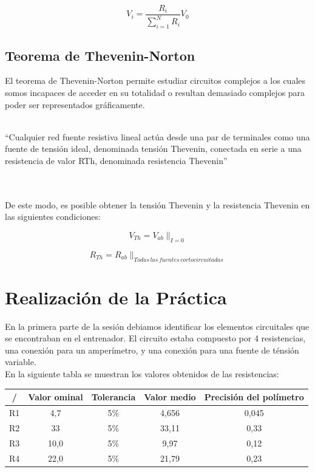 \documentclass[a4paper,11pt]{article}
\begin{document}
\begin{displaymath}
V_i=\frac{R_i}{\sum_{i=1}^N R_{i}}V_0
\end{displaymath}

\subsection{Teorema de Thevenin-Norton}
El teorema de Thevenin-Norton permite estudiar circuitos complejos a los cuales somos incapaces de acceder en su totalidad o resultan demasiado complejos para poder ser representados gráficamente.\\ \\
\begin{em}
“Cualquier red fuente resistiva lineal actúa desde una par de terminales como una fuente de tensión ideal, denominada tensión Thevenin, conectada en serie a una resistencia de valor RTh, denominada resistencia Thevenin”
\end{em}\\ \\
De este modo, es posible obtener la tensión Thevenin y la resistencia Thevenin en las siguientes condiciones:


\begin{displaymath}
V_{Th}=V_{ab}\|_{I=0}
\end{displaymath}

\begin{displaymath}
R_{Th}=R_{ab}\|_{Todas\,las\,fuentes\,cortocircuitadas}
\end{displaymath}

\section{Realización de la Práctica}
En la primera parte de la sesión debiamos identificar los elementos circuitales que se encontraban en el entrenador. El circuito estaba compuesto por 4 resistencias, una conexión para un amperímetro, y una conexión para una fuente de ténsión variable.\\
En la siguiente tabla se muestran los valores obtenidos de las resistencias:\\

\begin{tabular}{|c|c|c|c|c|}
\hline 
/ & Valor ominal & Tolerancia & Valor medio & Precisión del polímetro \\ 
\hline 
R1 & 4,7 & 5\% & 4,656 & 0,045 \\ 
\hline 
R2 & 33 & 5\% & 33,11 & 0,33 \\ 
\hline 
R3 & 10,0 & 5\% & 9,97 & 0,12 \\ 
\hline 
R4 & 22,0 & 5\% & 21,79 & 0,23 \\ 
\hline 
\end{tabular}\\
\end{document}
